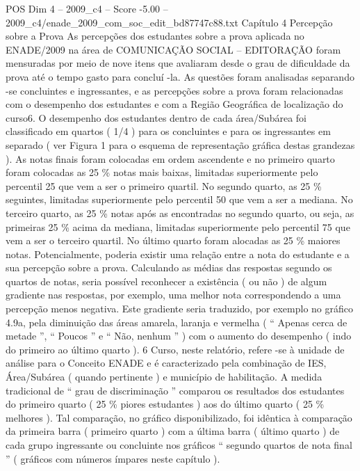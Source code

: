 \begin{textsample}{POS Dim 4 – 2009\_c4 – Score -5.00 – 2009\_c4/enade\_2009\_com\_soc\_edit\_bd87747c88.txt}  \label{ex:f4_pos_332}
Capítulo 4 Percepção sobre a Prova As percepções dos estudantes sobre a prova aplicada no ENADE/2009 na área de COMUNICAÇÃO SOCIAL – EDITORAÇÃO foram mensuradas por meio de nove itens que avaliaram desde o grau de dificuldade da prova até o tempo gasto para concluí -la.
As questões foram analisadas separando -se concluintes e ingressantes, e as percepções sobre a prova foram relacionadas com o desempenho dos estudantes e com a Região Geográfica de localização do curso6.
O desempenho dos estudantes dentro de cada área/Subárea foi classificado em quartos ( 1/4 ) para os concluintes e para os ingressantes em separado ( ver Figura 1 para o esquema de representação gráfica destas grandezas ).
As notas finais foram colocadas em ordem ascendente e no primeiro quarto foram colocadas as 25 \% notas mais baixas, limitadas superiormente pelo percentil 25 que vem a ser o primeiro quartil.
No segundo quarto, as 25 \% seguintes, limitadas superiormente pelo percentil 50 que vem a ser a mediana.
No terceiro quarto, as 25 \% notas após as encontradas no segundo quarto, ou seja, as primeiras 25 \% acima da mediana, limitadas superiormente pelo percentil 75 que vem a ser o terceiro quartil.
No último quarto foram alocadas as 25 \% maiores notas.
Potencialmente, poderia existir uma relação entre a nota do estudante e a sua percepção sobre a prova.
Calculando as médias das respostas segundo os quartos de notas, seria possível reconhecer a existência ( ou não ) de algum gradiente nas respostas, por exemplo, uma melhor nota correspondendo a uma percepção menos negativa.
Este gradiente seria traduzido, por exemplo no gráfico 4.9a, pela diminuição das áreas amarela, laranja e vermelha ( “ Apenas cerca de metade ”, “ Poucos ” e “ Não, nenhum ” ) com o aumento do desempenho ( indo do primeiro ao último quarto ). 6 Curso, neste relatório, refere -se à unidade de análise para o Conceito ENADE e é caracterizado pela combinação de IES, Área/Subárea ( quando pertinente ) e município de habilitação.
A medida tradicional de “ grau de discriminação ” comparou os resultados dos estudantes do primeiro quarto ( 25 \% piores estudantes ) aos do último quarto ( 25 \% melhores ).
Tal comparação, no gráfico disponibilizado, foi idêntica à comparação da primeira barra ( primeiro quarto ) com a última barra ( último quarto ) de cada grupo ingressante ou concluinte nos gráficos “ segundo quartos de nota final ” ( gráficos com números ímpares neste capítulo ).

\end{textsample}
